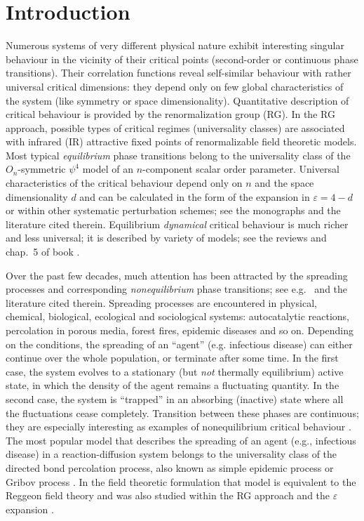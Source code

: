 \documentclass[12pt]{iopart}
\begin{document}

\maketitle

\section{Introduction} \label{sec:Intro}

Numerous systems of very different physical nature exhibit interesting
singular behaviour in the vicinity of their critical points
(second-order or continuous phase transitions). Their correlation functions
reveal self-similar behaviour with rather universal
critical dimensions: they depend only on few global characteristics of
the system (like symmetry or space dimensionality).
Quantitative description of critical behaviour is provided by the
renormalization group (RG). In the RG approach, possible types of critical
regimes (universality classes) are associated with infrared (IR) attractive
fixed points of renormalizable field theoretic models. Most typical
{\it equilibrium} phase
transitions belong to the universality class of the $O_{n}$-symmetric
$\psi^{4}$ model of an $n$-component scalar order parameter.
Universal characteristics of the critical behaviour depend only on $n$ and
the space dimensionality $d$ and can be calculated in the form of the
expansion in $\varepsilon=4-d$ or within other systematic perturbation
schemes; see the monographs \cite{Zinn,Book3} and the literature cited
therein. Equilibrium {\it dynamical} critical behaviour is much richer
and less universal; it is described by variety of models; see the
reviews \cite{HH} and chap.~5 of book \cite{Book3}.

Over the past few decades, much attention has been attracted by the
spreading processes and corresponding {\it nonequilibrium} phase
transitions; see e.g.~\cite{Hinr,JT} and the literature cited therein.
Spreading processes are encountered in
physical, chemical, biological, ecological and sociological systems:
autocatalytic reactions, percolation in porous media, forest fires,
epidemic diseases and so on. Depending on the conditions, the spreading
of an ``agent'' (e.g. infectious disease) can either
continue over the whole population, or terminate after some time. In the
first case, the system evolves to a stationary (but {\it not} thermally
equilibrium) active state, in which the density of the agent remains a
fluctuating quantity. In the second case, the system is ``trapped'' in an
absorbing (inactive) state where all the fluctuations cease completely.
Transition between these phases are continuous; they are especially
interesting as examples of nonequilibrium critical behaviour
\cite{Hinr}. The most popular model that describes the spreading
of an agent (e.g., infectious disease) in a reaction-diffusion system
belongs to the universality class of the directed bond percolation
process, also known as simple epidemic process or Gribov process
\cite{Hinr}. In the field theoretic formulation that model is equivalent
to the Reggeon field theory and was also studied within the
RG approach and the $\varepsilon$ expansion  \cite{JT}.
\end{document}
